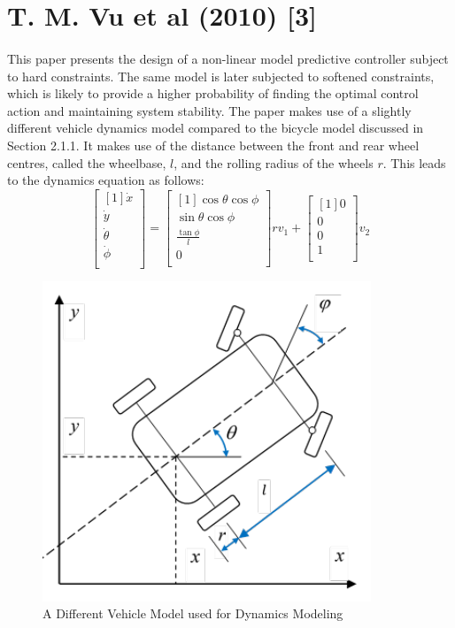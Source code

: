 \section{T. M. Vu et al (2010) [3]}
\paragraph{}
This paper presents the design of a non-linear model predictive controller subject to hard constraints. The same model is later subjected to softened constraints, which is likely to provide a higher probability of finding the optimal control action and maintaining system stability. The paper makes use of a slightly different vehicle dynamics model compared to the bicycle model discussed in Section 2.1.1. It makes use of the distance between the front and rear wheel centres, called the wheelbase, $l$, and the rolling radius of the wheels $r$. This leads to the dynamics equation as follows:
$$\begin{bmatrix}[1]
    \dot{x}\\ \dot{y}\\ \dot{\theta}\\  \dot{\phi}\\
\end{bmatrix}=\begin{bmatrix}[1]
    \cos\theta\cos\phi\\ \sin\theta\cos\phi\\ \frac{\tan\phi}{l}\\  0\\
\end{bmatrix}rv_1 + \begin{bmatrix}[1]
    0\\ 0\\ 0\\  1\\
\end{bmatrix}v_2$$

\begin{figure}[H]\label{fig3.4}
\centering \includegraphics[scale=0.8]{Images/paper3_vehicle_dynamics_model.png}
\caption{A Different Vehicle Model used for Dynamics Modeling}
\end{figure}

